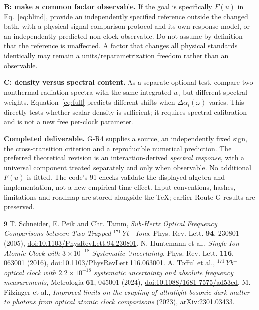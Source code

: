 \documentclass[11pt,a4paper]{article}
\begin{document}
\textbf{B: make a common factor observable.} If the goal is specifically
$F(u)$ in Eq.~\eqref{eq:blind}, provide an independently specified
reference outside the changed bath, with a physical signal-comparison
protocol and its own response model, or an independently predicted
non-clock observable. Do not assume by definition that the reference
is unaffected. A factor that changes all physical standards identically
may remain a units/reparametrization freedom rather than an observable.

\textbf{C: density versus spectral content.} As a separate optional test,
compare two nonthermal radiation spectra with the same integrated
$u_\gamma$ but different spectral weights. Equation~\eqref{eq:full}
predicts different shifts when $\Delta\alpha_i(\omega)$ varies.
This directly tests whether scalar density is sufficient; it requires
spectral calibration and is not a new free per-clock parameter.

\textbf{Completed deliverable.} G-R4 supplies a source, an independently
fixed sign, the cross-transition criterion and a reproducible numerical
prediction. The preferred theoretical revision is an interaction-derived
\emph{spectral response}, with a universal component treated separately
and only when observable. No additional $F(u)$ is fitted. The code's
91 checks validate the displayed algebra and implementation, not a
new empirical time effect. Input conventions, hashes, limitations and
roadmap are stored alongside the TeX; earlier Route-G results are preserved.

\begin{thebibliography}{9}\small
{} T. Schneider, E. Peik and Chr. Tamm,
\emph{Sub-Hertz Optical Frequency Comparisons between Two Trapped
$^{171}$Yb$^+$ Ions}, Phys. Rev. Lett. \textbf{94}, 230801 (2005),
\href{https://doi.org/10.1103/PhysRevLett.94.230801}{doi:10.1103/PhysRevLett.94.230801}.
 N. Huntemann et al., \emph{Single-Ion Atomic Clock
with $3\times10^{-18}$ Systematic Uncertainty}, Phys. Rev. Lett.
\textbf{116}, 063001 (2016),
\href{https://doi.org/10.1103/PhysRevLett.116.063001}{doi:10.1103/PhysRevLett.116.063001}.
 A. Tofful et al., \emph{$^{171}$Yb$^+$ optical clock
with $2.2\times10^{-18}$ systematic uncertainty and absolute frequency
measurements}, Metrologia \textbf{61}, 045001 (2024),
\href{https://doi.org/10.1088/1681-7575/ad53cd}{doi:10.1088/1681-7575/ad53cd}.
 M. Filzinger et al., \emph{Improved limits on the
coupling of ultralight bosonic dark matter to photons from optical
atomic clock comparisons} (2023),
\href{https://arxiv.org/abs/2301.03433}{arXiv:2301.03433}.
\end{thebibliography}
\end{document}
